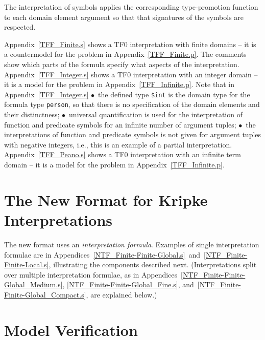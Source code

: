 \documentclass{easychair}
\newcommand{\smalltt}[1]{\small \texttt{#1}}
\begin{document}
The interpretation of symbols applies the corresponding type-promotion function to each domain
element argument so that that signatures of the symbols are respected.

Appendix~\ref{TFF_Finite.s} shows a TF0 interpretation with finite domains -- it is a 
countermodel for the problem in Appendix~\ref{TFF_Finite.p}.
The comments show which parts of the formula specify what aspects of the interpretation.
Appendix~\ref{TFF_Integer.s} shows a TF0 interpretation with an integer domain -- it 
is a model for the problem in Appendix~\ref{TFF_Infinite.p}.
Note that in Appendix~\ref{TFF_Integer.s}
$\bullet$~the defined type {\smalltt{\$int}} is the domain type for the formula type 
{\smalltt{person}}, so that there is no specification of the domain elements and their 
distinctness;
$\bullet$~universal quantification is used for the interpretation of function and predicate
symbols for an infinite number of argument tuples;
$\bullet$~the interpretations of function and predicate symbols is not given for argument 
tuples with negative integers, i.e., this is an example of a partial interpretation.
Appendix~\ref{TFF_Peano.s} shows a TF0 interpretation with an infinite term domain -- it 
is a model for the problem in Appendix~\ref{TFF_Infinite.p}.

\section{The New Format for Kripke Interpretations}
\label{NewKripke}
 
The new format uses an {\em interpretation formula}. 
Examples of single interpretation formulae are in 
Appendices~\ref{NTF_Finite-Finite-Global.s}~and~\ref{NTF_Finite-Finite-Local.s}, 
illustrating the components described next. 
(Interpretations split over multiple interpretation formulae, as in 
Appendices~\ref{NTF_Finite-Finite-Global_Medium.s}, \ref{NTF_Finite-Finite-Global_Fine.s}, 
and~\ref{NTF_Finite-Finite-Global_Compact.s}, are explained below.)

\section{Model Verification}
\label{Verification}
\end{document}
